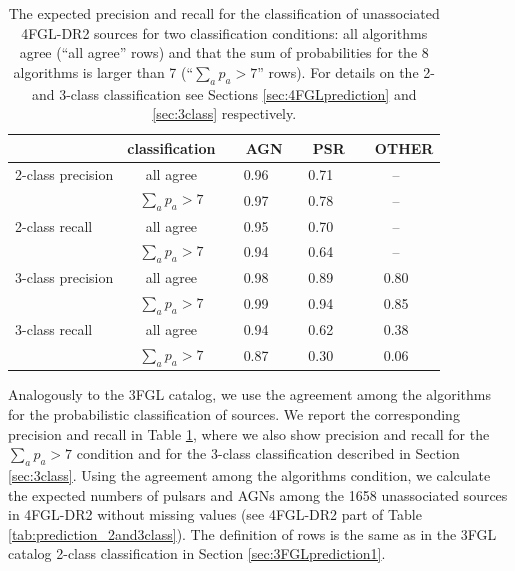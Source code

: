 \begin{table}[!h]
\centering
    \tiny
  
 \renewcommand{\tabcolsep}{0.3mm}
\renewcommand{\arraystretch}{1.5}

    \begin{tabular}{l c c c c}
    \hline
    \hline
    & classification &\ \  AGN &\ \   PSR &\ \   OTHER \\
    \hline
    2-class precision & all     agree            & 0.96 &  0.71 & --  \\ 
                                & $\sum_a p_a > 7$ & 0.97 &  0.78  & -- \\
    \hline
    2-class recall       & all     agree            & 0.95 &  0.70 & --  \\ 
                                & $\sum_a p_a > 7$ & 0.94 &  0.64  & -- \\
    \hline
    3-class precision & all     agree            & 0.98 & 0.89  & 0.80  \\ 
                                & $\sum_a p_a > 7$ & 0.99 &  0.94  & 0.85 \\
    \hline
    3-class recall       & all     agree            & 0.94 &  0.62 & 0.38  \\ 
                                & $\sum_a p_a > 7$ & 0.87 &  0.30  & 0.06 \\
    \hline
    \end{tabular}%
    \vspace{2mm}
    \caption{The expected precision and recall for the classification of unassociated 4FGL-DR2 sources
    for two classification conditions: all algorithms agree (``all agree'' rows) and that the sum of probabilities for the 8 algorithms 
    is larger than 7 (``$\sum_a p_a > 7$'' rows). For details on the 2- and 3-class classification see Sections \ref{sec:4FGLprediction} and 
    \ref{sec:3class} respectively. }
    \label{tab:prec_recall_4FGL}
\end{table}

Analogously to the 3FGL catalog, we use the agreement among the algorithms for the probabilistic classification of sources.
We report the corresponding precision and recall in Table \ref{tab:prec_recall_4FGL}, where we also show precision and recall
for the $\sum_a p_a > 7$ condition and for the 3-class classification described in Section \ref{sec:3class}.
Using the agreement among the algorithms condition,
we calculate the expected numbers of pulsars and AGNs among the 1658 unassociated sources in 4FGL-DR2 without missing values 
(see 4FGL-DR2 part of Table \ref{tab:prediction_2and3class}).
The definition of rows is the same as in the 3FGL catalog 2-class classification in Section \ref{sec:3FGLprediction1}.

